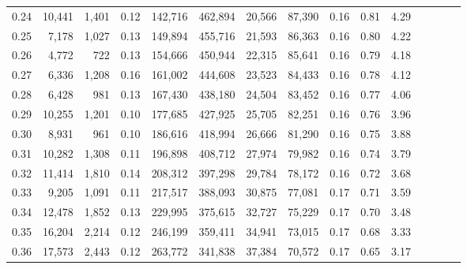 \begin{tabular}{rrrcrrrrrrrrrrr}
0.24 &  10,441 &  1,401 &                                       0.12 &  142,716 &  462,894 &   20,566 &   87,390 &  0.16 &  0.81 &                         4.29 \\
0.25 &   7,178 &  1,027 &                                       0.13 &  149,894 &  455,716 &   21,593 &   86,363 &  0.16 &  0.80 &                         4.22 \\
0.26 &   4,772 &    722 &                                       0.13 &  154,666 &  450,944 &   22,315 &   85,641 &  0.16 &  0.79 &                         4.18 \\
0.27 &   6,336 &  1,208 &                                       0.16 &  161,002 &  444,608 &   23,523 &   84,433 &  0.16 &  0.78 &                         4.12 \\
0.28 &   6,428 &    981 &                                       0.13 &  167,430 &  438,180 &   24,504 &   83,452 &  0.16 &  0.77 &                         4.06 \\
0.29 &  10,255 &  1,201 &                                       0.10 &  177,685 &  427,925 &   25,705 &   82,251 &  0.16 &  0.76 &                         3.96 \\
0.30 &   8,931 &    961 &                                       0.10 &  186,616 &  418,994 &   26,666 &   81,290 &  0.16 &  0.75 &                         3.88 \\
0.31 &  10,282 &  1,308 &                                       0.11 &  196,898 &  408,712 &   27,974 &   79,982 &  0.16 &  0.74 &                         3.79 \\
0.32 &  11,414 &  1,810 &                                       0.14 &  208,312 &  397,298 &   29,784 &   78,172 &  0.16 &  0.72 &                         3.68 \\
0.33 &   9,205 &  1,091 &                                       0.11 &  217,517 &  388,093 &   30,875 &   77,081 &  0.17 &  0.71 &                         3.59 \\
0.34 &  12,478 &  1,852 &                                       0.13 &  229,995 &  375,615 &   32,727 &   75,229 &  0.17 &  0.70 &                         3.48 \\
0.35 &  16,204 &  2,214 &                                       0.12 &  246,199 &  359,411 &   34,941 &   73,015 &  0.17 &  0.68 &                         3.33 \\
0.36 &  17,573 &  2,443 &                                       0.12 &  263,772 &  341,838 &   37,384 &   70,572 &  0.17 &  0.65 &                         3.17 \\

\end{tabular}
